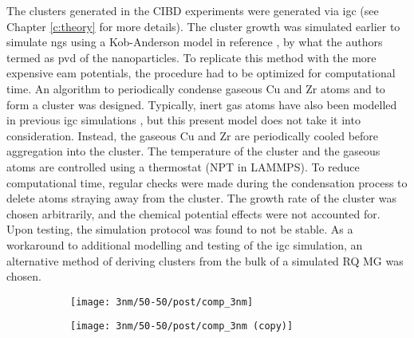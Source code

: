 The clusters generated in the CIBD experiments \cite{Benel2018,Benel2019} were generated via \gls{igc} (see Chapter \ref{c:theory} for more details). The cluster growth was simulated earlier to simulate \gls{ng}s using a Kob-Anderson model in reference \cite{Danilov2016}, by what the authors termed as \gls{pvd} of the nanoparticles. To replicate this method with the more expensive \gls{eam} potentials, the procedure had to be optimized for computational time. An algorithm to periodically condense gaseous Cu and Zr atoms and to form a cluster was designed. Typically, inert gas atoms have also been modelled in previous \gls{igc} simulations \cite{Krasnochtchekov2003,Krasnochtchekov2005}, but this present model does not take it into consideration. Instead, the gaseous Cu and Zr are periodically cooled before aggregation into the cluster. The temperature of the cluster and the gaseous atoms are controlled using a thermostat (NPT in LAMMPS). To reduce computational time, regular checks were made during the condensation process to delete atoms straying away from the cluster. The growth rate of the cluster was chosen arbitrarily, and the chemical potential effects were not accounted for. Upon testing, the simulation protocol was found to not be stable. As a workaround to additional modelling and testing of the \gls{igc} simulation, an alternative method of deriving clusters from the bulk of a simulated RQ MG was chosen. \par

\begin{figure}[t]
	\centering
	\begin{subfigure}{0.5\textwidth} 	\centering
		\texttt{[image: 3nm/50-50/post/comp\_3nm]} \caption{}
		\label{f:radial_3nm}
	\end{subfigure}%
	\begin{subfigure}{0.5\columnwidth} 	\centering
		\texttt{[image: 3nm/50-50/post/comp\_3nm (copy)]} \caption{}
		\label{f:radial_3nm_alt}
	\end{subfigure}%
	\label{f:clus_rad-3nm}
\end{figure}

